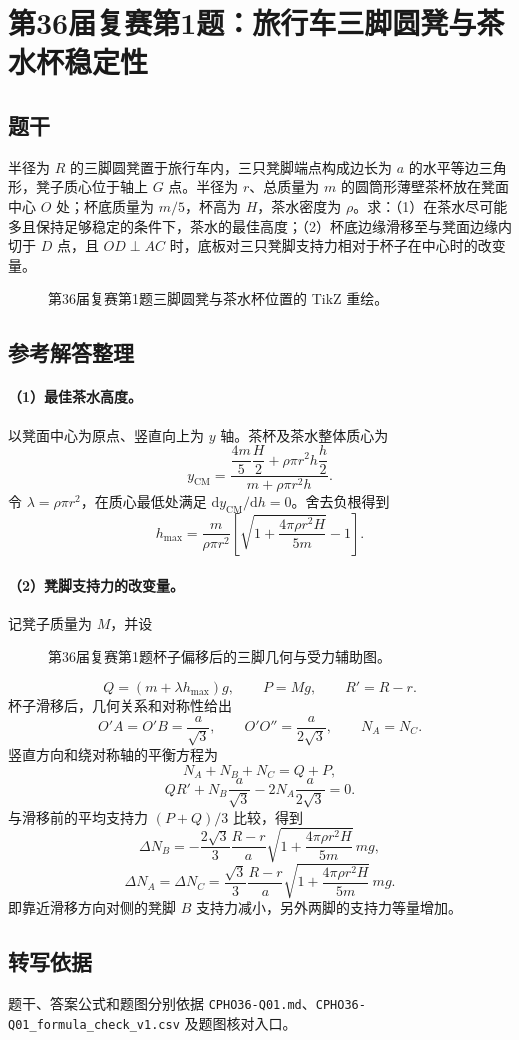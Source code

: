 \section{第36届复赛第1题：旅行车三脚圆凳与茶水杯稳定性}
\subsection{题干}
半径为 $R$ 的三脚圆凳置于旅行车内，三只凳脚端点构成边长为 $a$ 的水平等边三角形，凳子质心位于轴上 $G$ 点。半径为 $r$、总质量为 $m$ 的圆筒形薄壁茶杯放在凳面中心 $O$ 处；杯底质量为 $m/5$，杯高为 $H$，茶水密度为 $\rho$。求：（1）在茶水尽可能多且保持足够稳定的条件下，茶水的最佳高度；（2）杯底边缘滑移至与凳面边缘内切于 $D$ 点，且 $OD\perp AC$ 时，底板对三只凳脚支持力相对于杯子在中心时的改变量。
\begin{figure}[htbp]\centering

\caption{第36届复赛第1题三脚圆凳与茶水杯位置的 TikZ 重绘。}\label{fig:cpho36q01}
\end{figure}

\subsection{参考解答整理}
\paragraph{（1）最佳茶水高度。} 以凳面中心为原点、竖直向上为 $y$ 轴。茶杯及茶水整体质心为
\[
y_{\mathrm{CM}}=
\frac{\dfrac{4m}{5}\dfrac H2+\rho\pi r^2h\dfrac h2}
{m+\rho\pi r^2h}.
\]
令 $\lambda=\rho\pi r^2$，在质心最低处满足 $\mathrm dy_{\mathrm{CM}}/\mathrm dh=0$。舍去负根得到
\[
\boxed{
h_{\max}=\frac{m}{\rho\pi r^2}
\left[\sqrt{1+\frac{4\pi\rho r^2H}{5m}}-1\right].
}
\]

\paragraph{（2）凳脚支持力的改变量。} 记凳子质量为 $M$，并设
\begin{figure}[htbp]\centering

\caption{第36届复赛第1题杯子偏移后的三脚几何与受力辅助图。}\label{fig:cpho36q01forces}
\end{figure}
\[
Q=(m+\lambda h_{\max})g,\qquad P=Mg,\qquad R'=R-r.
\]
杯子滑移后，几何关系和对称性给出
\[
O'A=O'B=\frac{a}{\sqrt3},\qquad
O'O''=\frac{a}{2\sqrt3},\qquad N_A=N_C.
\]
竖直方向和绕对称轴的平衡方程为
\[
N_A+N_B+N_C=Q+P,
\]
\[
Q R'+N_B\frac{a}{\sqrt3}-2N_A\frac{a}{2\sqrt3}=0.
\]
与滑移前的平均支持力 $(P+Q)/3$ 比较，得到
\[
\boxed{
\Delta N_B=-\frac{2\sqrt3}{3}\frac{R-r}{a}
\sqrt{1+\frac{4\pi\rho r^2H}{5m}}\,mg,
}
\]
\[
\boxed{
\Delta N_A=\Delta N_C=\frac{\sqrt3}{3}\frac{R-r}{a}
\sqrt{1+\frac{4\pi\rho r^2H}{5m}}\,mg.
}
\]
即靠近滑移方向对侧的凳脚 $B$ 支持力减小，另外两脚的支持力等量增加。

\subsection{转写依据}
题干、答案公式和题图分别依据 \texttt{CPHO36-Q01.md}、\texttt{CPHO36-Q01\_formula\_check\_v1.csv} 及题图核对入口。

